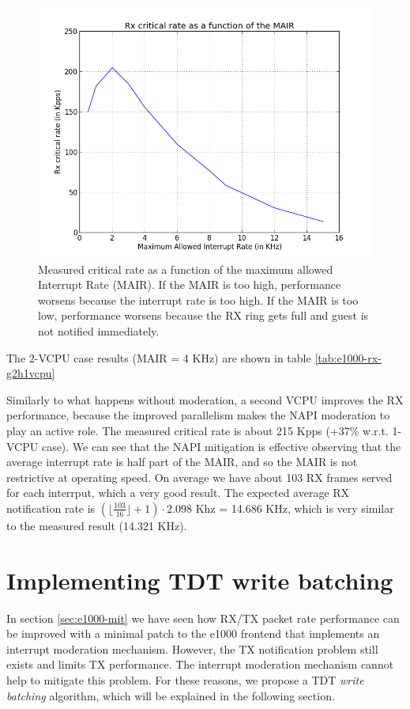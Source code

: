 \begin{figure}[bt]
\centering
\includegraphics[scale = 0.7]{MAIR-vs-CR.png}
\caption{Measured critical rate as a function of the maximum allowed Interrupt Rate (MAIR). If the MAIR is too high, performance worsens
	because the interrupt rate is too high. If the MAIR is too low, performance worsens because the RX ring gets full and guest
	is not notified immediately.}
\label{fig:itr-vs-cr}
\end{figure}


\vspace{0.5cm}

The 2-VCPU case results (MAIR = 4 KHz) are shown in table \ref{tab:e1000-rx-g2h1vcpu}

Similarly to what happens without moderation, a second VCPU improves the RX performance, because the improved parallelism makes the
NAPI moderation to play an active role.
The measured critical rate is about 215 Kpps (+37\% w.r.t. 1-VCPU case).
We can see that the NAPI mitigation is effective observing that the average interrupt rate is half part of the MAIR, and so the MAIR is not
restrictive at operating speed. On average we have about 103 RX frames served for each interrput, which a very good result.
The expected average RX notification rate is $(\lfloor \frac{103}{16} \rfloor + 1) \cdot 2.098$ Khz = 14.686 KHz, which is very similar to
the measured result (14.321 KHz).




\section{Implementing TDT write batching}
In section \ref{sec:e1000-mit} we have seen how RX/TX packet rate performance can be improved with a minimal patch to the
e1000 frontend that implements an interrupt moderation mechanism.
However, the TX notification problem still exists and limits TX performance. The interrupt moderation mechanism cannot help to mitigate
this problem. For these reasons, we propose a TDT \emph{write batching} algorithm, which will be explained in the following section.



